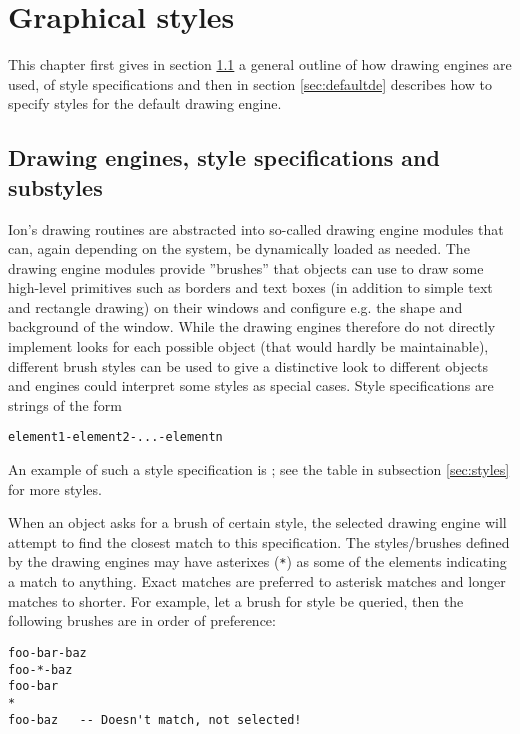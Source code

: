 
\chapter{Graphical styles}

This chapter first gives in section \ref{sec:engines} a general outline 
of how drawing engines are used, of style specifications and then
in section \ref{sec:defaultde} describes how to specify styles
for the default drawing engine.

\section{Drawing engines, style specifications and substyles}
\label{sec:engines}

Ion's drawing routines are abstracted into so-called drawing engine
modules that can, again depending on the system, be dynamically
loaded as needed. The drawing engine modules provide ''brushes''
that objects can use to draw some high-level primitives such
as borders and text boxes (in addition to simple text and rectangle
drawing) on their windows and configure e.g. the shape and 
background of the window. While the drawing engines therefore
do not directly implement looks for each possible object (that
would hardly be maintainable), different brush styles can be
used to give a distinctive look to different objects and engines
could interpret some styles as special cases. Style specifications 
are strings of the form

\begin{verbatim}
element1-element2-...-elementn
\end{verbatim}

An example of such a style specification is ;
see the table in subsection \ref{sec:styles} for more styles.

When an object asks for a brush of certain style, the selected
drawing engine will attempt to find the closest match to this
specification. The styles/brushes defined by the drawing engines 
may have asterixes (\verb!*!) as some of the elements indicating
a match to anything. Exact matches are preferred to asterisk
matches and longer matches to shorter. For example, let a brush
for style  be queried, then the following
brushes are in order of preference:

\begin{verbatim}
foo-bar-baz
foo-*-baz
foo-bar
*
foo-baz   -- Doesn't match, not selected!
\end{verbatim}

